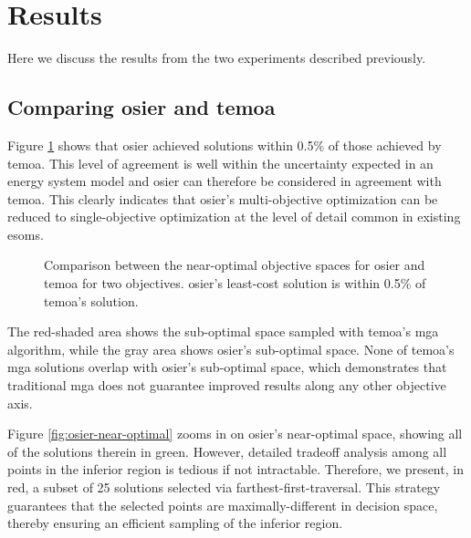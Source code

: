 \section{Results}

Here we discuss the results from the two experiments described previously.

\subsection{Comparing \gls{osier} and \gls{temoa}}

Figure \ref{fig:osier-temoa-benchmark} shows that \gls{osier} achieved solutions
within 0.5\%  of those achieved by \gls{temoa}. This level of agreement is well
within the uncertainty expected in an energy system model and \gls{osier} can
therefore be considered in agreement with \gls{temoa}. This clearly indicates
that \gls{osier}'s multi-objective optimization can be reduced to
single-objective optimization at the level of detail common in existing
\glspl{esom}.

\begin{figure}[ht!]
    \begin{center}
        \resizebox{\columnwidth}{!}{}
        \caption{Comparison between the near-optimal objective spaces for
        \gls{osier} and \gls{temoa} for two objectives. \gls{osier}'s least-cost
        solution is within 0.5\% of \gls{temoa}'s solution.}
        \label{fig:osier-temoa-benchmark}
    \end{center}
\end{figure}

The red-shaded area shows the sub-optimal space sampled with \gls{temoa}'s
\gls{mga} algorithm, while the gray area shows \gls{osier}'s sub-optimal space.
None of \gls{temoa}'s \gls{mga} solutions overlap with \gls{osier}'s sub-optimal
space, which demonstrates that traditional \gls{mga} does not guarantee improved
results along any other objective axis. 

Figure \ref{fig:osier-near-optimal} zooms in on \gls{osier}'s near-optimal
space, showing all of the solutions therein in green. However, detailed tradeoff
analysis among all points in the inferior region is tedious if not intractable.
Therefore, we present, in red, a subset of 25 solutions selected via
farthest-first-traversal. This strategy guarantees that the selected points are
maximally-different in decision space, thereby ensuring an efficient sampling of
the inferior region.


